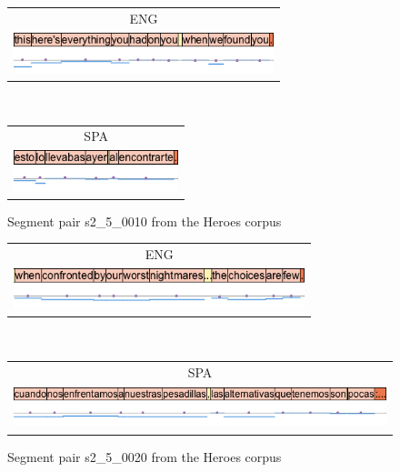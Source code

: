 \begin{figure}[h!]
\centering
\begin{tabular}{c}
ENG \\
\includegraphics[height=1.2cm]{img/s2_5_0010-EN.png} \\
\end{tabular}
\\
\begin{tabular}{c}
SPA \\
\includegraphics[height=1.2cm]{img/s2_5_0010-ES.png} \\
\end{tabular}
\caption{Segment pair s2\_5\_0010 from the Heroes corpus}
\label{figure:heroes_viz_2}
\end{figure}

\begin{figure}[h!]
\centering
\begin{tabular}{c}
ENG \\
\includegraphics[height=1.2cm]{img/s2_5_0020-EN.png} \\
\end{tabular}
\\
\begin{tabular}{c}
SPA \\
\includegraphics[height=1.2cm]{img/s2_5_0020-ES.png} \\
\end{tabular}
\caption{Segment pair s2\_5\_0020 from the Heroes corpus}
\label{figure:heroes_viz_3}
\end{figure}

